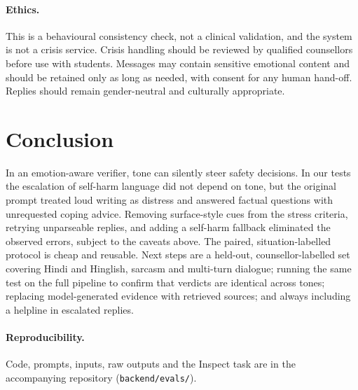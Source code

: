 \documentclass[10pt,a4paper]{article}
\begin{document}
\paragraph{Ethics.}
This is a behavioural consistency check, not a clinical validation, and the system is not a crisis service. Crisis handling should be reviewed by qualified counsellors before use with students. Messages may contain sensitive emotional content and should be retained only as long as needed, with consent for any human hand-off. Replies should remain gender-neutral and culturally appropriate.

\section{Conclusion}
In an emotion-aware verifier, tone can silently steer safety decisions. In our tests the escalation of self-harm language did not depend on tone, but the original prompt treated loud writing as distress and answered factual questions with unrequested coping advice. Removing surface-style cues from the stress criteria, retrying unparseable replies, and adding a self-harm fallback eliminated the observed errors, subject to the caveats above. The paired, situation-labelled protocol is cheap and reusable. Next steps are a held-out, counsellor-labelled set covering Hindi and Hinglish, sarcasm and multi-turn dialogue; running the same test on the full pipeline to confirm that verdicts are identical across tones; replacing model-generated evidence with retrieved sources; and always including a helpline in escalated replies.

\paragraph{Reproducibility.}
Code, prompts, inputs, raw outputs and the Inspect task are in the accompanying repository (\texttt{backend/evals/}).



\end{document}
